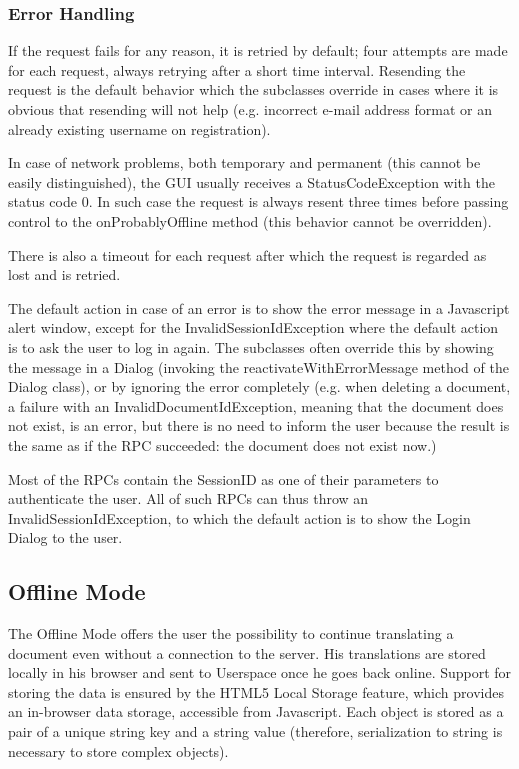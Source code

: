 \subsubsection{Error Handling}

If the request fails for any reason, it is retried by default; four attempts are made for each request, always retrying after a short time interval.
Resending the request is the default behavior which the subclasses override in cases where it is obvious that resending will not help (e.g. incorrect e-mail address format or an already existing username on registration).

In case of network problems, both temporary and permanent (this cannot be easily distinguished), the GUI usually receives a StatusCodeException with the status code 0. In such case the request is always resent three times before passing control to the onProbablyOffline method (this behavior cannot be overridden).

There is also a timeout for each request after which the request is regarded as lost and is retried.

The default action in case of an error is to show the error message in a Javascript alert window, except for the InvalidSessionIdException where the default action is to ask the user to log in again.
The subclasses often override this by showing the message in a Dialog (invoking the reactivateWithErrorMessage method of the Dialog class), or by ignoring the error completely (e.g. when deleting a document, a failure with an InvalidDocumentIdException, meaning that the document does not exist, is an error, but there is no need to inform the user because the result is the same as if the RPC succeeded: the document does not exist now.)

Most of the RPCs contain the SessionID as one of their parameters to authenticate the user. All of such RPCs can thus throw an InvalidSessionIdException, to which the default action is to show the Login Dialog to the user.

\subsection{Offline Mode}


The Offline Mode offers the user the possibility to continue translating a document even without a connection to the server. His translations are stored locally in his browser and sent to Userspace once he goes back online.
Support for storing the data is ensured by the HTML5 Local Storage feature, which provides an in-browser data storage, accessible from Javascript.
Each object is stored as a pair of a unique string key and a string value (therefore, serialization to string is necessary to store complex objects).

